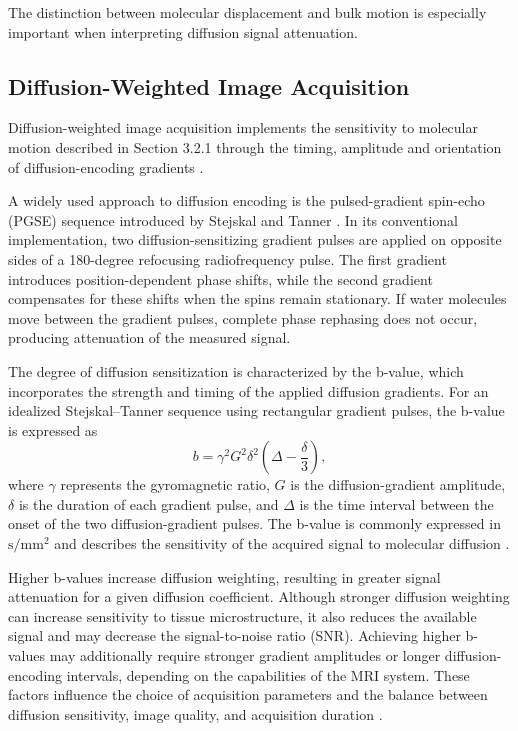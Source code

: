 The distinction between molecular displacement and bulk motion is especially important when interpreting diffusion signal attenuation.

\subsection{Diffusion-Weighted Image Acquisition}

Diffusion-weighted image acquisition implements the sensitivity to molecular motion described in Section 3.2.1 through the timing, amplitude and orientation of diffusion-encoding gradients \autocite{stejskal1965diffusion,basser1994tensor}.

A widely used approach to diffusion encoding is the pulsed-gradient spin-echo (PGSE) sequence introduced by Stejskal and Tanner \autocite{stejskal1965diffusion}. In its conventional implementation, two diffusion-sensitizing gradient pulses are applied on opposite sides of a 180-degree refocusing radiofrequency pulse. The first gradient introduces position-dependent phase shifts, while the second gradient compensates for these shifts when the spins remain stationary. If water molecules move between the gradient pulses, complete phase rephasing does not occur, producing attenuation of the measured signal.

The degree of diffusion sensitization is characterized by the b-value, which incorporates the strength and timing of the applied diffusion gradients. For an idealized Stejskal--Tanner sequence using rectangular gradient pulses, the b-value is expressed as
\begin{equation}
b = \gamma^2 G^2 \delta^2 \left(\Delta-\frac{\delta}{3}\right),
\end{equation}
where $\gamma$ represents the gyromagnetic ratio, $G$ is the diffusion-gradient amplitude, $\delta$ is the duration of each gradient pulse, and $\Delta$ is the time interval between the onset of the two diffusion-gradient pulses. The b-value is commonly expressed in $\mathrm{s/mm^2}$ and describes the sensitivity of the acquired signal to molecular diffusion \autocite{stejskal1965diffusion}.

Higher b-values increase diffusion weighting, resulting in greater signal attenuation for a given diffusion coefficient. Although stronger diffusion weighting can increase sensitivity to tissue microstructure, it also reduces the available signal and may decrease the signal-to-noise ratio (SNR). Achieving higher b-values may additionally require stronger gradient amplitudes or longer diffusion-encoding intervals, depending on the capabilities of the MRI system. These factors influence the choice of acquisition parameters and the balance between diffusion sensitivity, image quality, and acquisition duration \autocite{snoussi2025haitch}.

